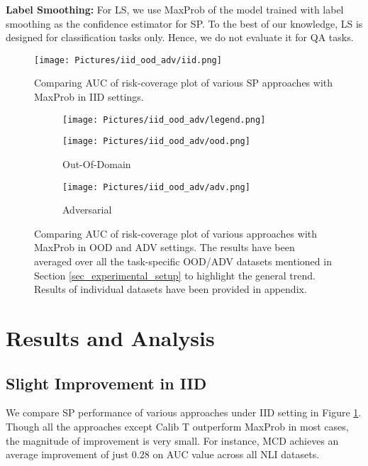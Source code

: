 \documentclass[11pt]{article}
\begin{document}
\textbf{Label Smoothing: }For LS, we use MaxProb of the model trained with label smoothing as the confidence estimator for SP.
To the best of our knowledge, LS is designed for classification tasks only. Hence, we do not evaluate it for QA tasks.




\begin{figure}
    \centering
    \texttt{[image: Pictures/iid\_ood\_adv/iid.png]}
    \caption{Comparing AUC of risk-coverage plot of various SP approaches with MaxProb in IID settings.}
    \label{fig:iid_results}
\end{figure}


\begin{figure*}[t]
\centering
    \begin{subfigure}{.1\textwidth}
        \texttt{[image: Pictures/iid\_ood\_adv/legend.png]}
    \end{subfigure}
    \begin{subfigure}{.37\textwidth}
        \texttt{[image: Pictures/iid\_ood\_adv/ood.png]}
        \caption{Out-Of-Domain}
        \label{ood_fig}
    \end{subfigure}
    \begin{subfigure}{.34\textwidth}
         \texttt{[image: Pictures/iid\_ood\_adv/adv.png]}
         \caption{Adversarial}
         \label{adv_fig}
    \end{subfigure}
    
    \caption{Comparing AUC of risk-coverage plot of various approaches with MaxProb in OOD and ADV settings.
    The results have been averaged over all the task-specific OOD/ADV datasets mentioned in Section \ref{sec_experimental_setup} to highlight the general trend.
    Results of individual datasets have been provided in appendix.
    }
    \label{fig:ood_adv_results}    
\end{figure*}

\section{Results and Analysis}

\subsection{Slight Improvement in IID}
We compare SP performance of various approaches under IID setting in Figure \ref{fig:iid_results}.
Though all the approaches except Calib T outperform MaxProb in most cases, the magnitude of improvement is very small.
For instance, MCD achieves an average improvement of just $0.28$ on AUC value across all NLI datasets.
\end{document}
